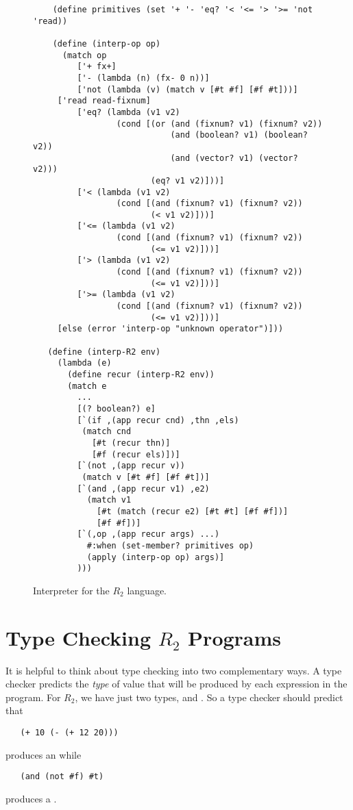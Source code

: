 \documentclass[11pt]{book}
\begin{document}
\begin{figure}[tbp]
\begin{lstlisting}
    (define primitives (set '+ '- 'eq? '< '<= '> '>= 'not 'read))

    (define (interp-op op)
      (match op
         ['+ fx+]
         ['- (lambda (n) (fx- 0 n))]
         ['not (lambda (v) (match v [#t #f] [#f #t]))]
	 ['read read-fixnum]
         ['eq? (lambda (v1 v2)
                 (cond [(or (and (fixnum? v1) (fixnum? v2))
                            (and (boolean? v1) (boolean? v2))
                            (and (vector? v1) (vector? v2)))
                        (eq? v1 v2)]))]
         ['< (lambda (v1 v2)
                 (cond [(and (fixnum? v1) (fixnum? v2))
                        (< v1 v2)]))]
         ['<= (lambda (v1 v2)
                 (cond [(and (fixnum? v1) (fixnum? v2))
                        (<= v1 v2)]))]
         ['> (lambda (v1 v2)
                 (cond [(and (fixnum? v1) (fixnum? v2))
                        (<= v1 v2)]))]
         ['>= (lambda (v1 v2)
                 (cond [(and (fixnum? v1) (fixnum? v2))
                        (<= v1 v2)]))]
	 [else (error 'interp-op "unknown operator")]))

   (define (interp-R2 env)
     (lambda (e)
       (define recur (interp-R2 env))
       (match e
         ...
         [(? boolean?) e]
         [`(if ,(app recur cnd) ,thn ,els)
          (match cnd
            [#t (recur thn)]
            [#f (recur els)])]
         [`(not ,(app recur v))
          (match v [#t #f] [#f #t])]
         [`(and ,(app recur v1) ,e2)
           (match v1
             [#t (match (recur e2) [#t #t] [#f #f])]
             [#f #f])]
         [`(,op ,(app recur args) ...)
           #:when (set-member? primitives op)
           (apply (interp-op op) args)]
         )))
\end{lstlisting}
\caption{Interpreter for the $R_2$ language.}
\label{fig:interp-R2}
\end{figure}


\section{Type Checking $R_2$ Programs}
\label{sec:type-check-r2}

It is helpful to think about type checking into two complementary
ways. A type checker predicts the \emph{type} of value that will be
produced by each expression in the program.  For $R_2$, we have just
two types,  and . So a type checker should
predict that
\begin{lstlisting}
   (+ 10 (- (+ 12 20)))
\end{lstlisting}
produces an  while
\begin{lstlisting}
   (and (not #f) #t)
\end{lstlisting}
produces a .
\end{document}
